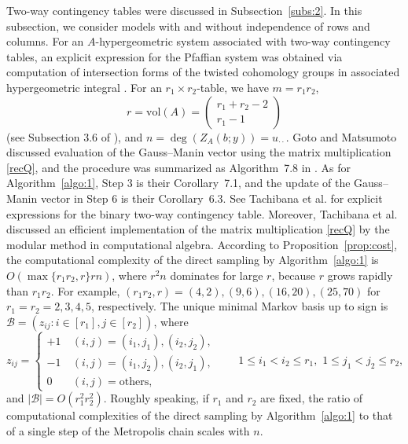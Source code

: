 \documentclass[a4paper,12pt]{article}
\theoremstyle{plain}
\theoremstyle{remark}
\begin{document}
Two-way contingency tables were discussed in Subsection~\ref{subs:2}.
In this subsection, we consider models with and without independence
of rows and columns. For an $A$-hypergeometric system associated
with two-way contingency tables, an explicit expression for
the Pfaffian system was obtained via computation of intersection
forms of the twisted cohomology groups in associated hypergeometric
integral \cite{GM18}. For an $r_1\times r_2$-table,
we have $m=r_1r_2$,
\[
  r=\text{vol}(A)
  =\left(\begin{array}{c}r_1+r_2-2\\r_1-1\end{array}\right)
\]
(see Subsection 3.6 of \cite{AK11}), and
$n=\deg(Z_A(b;y))=u_{\cdot\cdot}$. Goto and Matsumoto \cite{GM18}
discussed evaluation of the Gauss--Manin vector using the matrix
multiplication \eqref{recQ}, and the procedure was summarized as
Algorithm~7.8 in \cite{GM18}. As for Algorithm~\ref{algo:1},
Step 3 is their Corollary~7.1, and the update of the Gauss--Manin
vector in Step 6 is their Corollary~6.3. See Tachibana et al.
\cite{TGKT20} for explicit expressions for the binary two-way
contingency table. Moreover, Tachibana et al. discussed
an efficient implementation of the matrix multiplication
\eqref{recQ} by the modular method in computational algebra.
According to Proposition~\ref{prop:cost}, the computational complexity
of the direct sampling by Algorithm~\ref{algo:1} is
$O(\max\{r_1r_2,r\}rn)$,
where $r^2n$ dominates for large $r$, because $r$ grows
rapidly than $r_1r_2$. For example,
$(r_1r_2,r)=(4,2),(9,6),(16,20),(25,70)$ for $r_1=r_2=2,3,4,5$,
respectively. The unique minimal Markov basis up to sign is
$\mathcal{B}=(z_{ij}:i\in[r_1],j\in[r_2])$, where
\begin{equation}
  z_{ij}=\left\{
  \begin{array}{rl}
  +1& ~(i,j)=(i_1,j_1),(i_2,j_2),\\
  -1& ~(i,j)=(i_1,j_2),(i_2,j_1),\\
   0& ~(i,j)=\text{others},
  \end{array}
  \right.\qquad 1\le i_1<i_2\le r_1, \,\, 1\le j_1<j_2\le r_2,
  \label{MB2}
\end{equation}
and $|\mathcal{B}|=O(r_1^2r_2^2)$. Roughly speaking, if
$r_1$ and $r_2$ are fixed, the ratio of computational
complexities of the direct sampling by Algorithm~\ref{algo:1}
to that of a single step of the Metropolis chain scales with
$n$.
\end{document}
